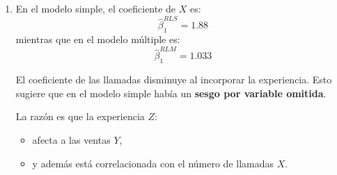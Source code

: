 \documentclass[10pt,a4paper]{article}
\begin{document}
\begin{enumerate}
\begin{enumerate}
    Es decir:
    \[
    \begin{pmatrix}
    \hat\beta_0\\
    \hat\beta_1\\
    \hat\beta_2
    \end{pmatrix}
    =        \begin{pmatrix}
        7.013 & -0.644 & 0.567\\
        -0.644 & 0.067 & -0.079\\
        0.567 & -0.079 & 0.145
        \end{pmatrix} 
    \begin{pmatrix}
    208\\
    2991\\
    828
    \end{pmatrix}
    \]

    Resolviendo, se obtiene:
    \[
\begin{pmatrix}
    \hat\beta_0\\
    \hat\beta_1\\
    \hat\beta_2
    \end{pmatrix} = 
    \begin{pmatrix}
    1.976\\
    1.033\\
    1.707
    \end{pmatrix}
    \]

    Por lo tanto, la regresión múltiple estimada es:
    \[
    \hat Y_i=1.976+1.033X_i+1.707Z_i
    \]

    \textbf{Interpretación de \(\hat{\beta}_1\):}  
    Manteniendo constante la experiencia, una llamada adicional de seguimiento aumenta en promedio las ventas mensuales en \(1.033\) cientos de miles de pesos.

    \textbf{Interpretación de \(\hat{\beta}_2\):}  
    Manteniendo constante el número de llamadas, un año adicional de experiencia aumenta en promedio las ventas mensuales en \(1.707\) cientos de miles de pesos.

    \item En el modelo simple, el coeficiente de \(X\) es:
    \[
    \hat\beta_1^{RLS}=1.88
    \]
    mientras que en el modelo múltiple es:
    \[
    \hat\beta_1^{RLM}=1.033
    \]

    El coeficiente de las llamadas disminuye al incorporar la experiencia. Esto sugiere que en el modelo simple había un \textbf{sesgo por variable omitida}.

    La razón es que la experiencia \(Z\):
    \begin{itemize}
        \item afecta a las ventas \(Y\),
        \item y además está correlacionada con el número de llamadas \(X\).
    \end{itemize}


\end{enumerate}
\end{enumerate}
\end{document}
